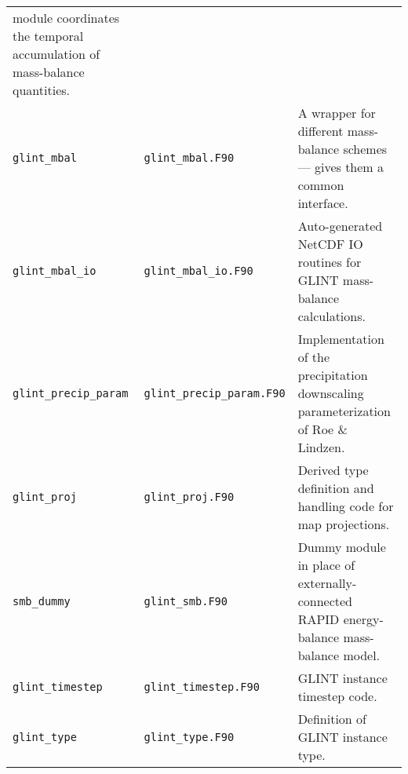 \begin{center}
\begin{supertabular}{|l|l|p{7cm}|}
    module coordinates the temporal accumulation of mass-balance quantities.\\
    \texttt{glint\_mbal} & \texttt{glint\_mbal.F90} & A wrapper for different
    mass-balance schemes --- gives them a common interface. \\
    \texttt{glint\_mbal\_io} & \texttt{glint\_mbal\_io.F90} & Auto-generated
    NetCDF IO routines for GLINT mass-balance calculations. \\
    \texttt{glint\_precip\_param} & \texttt{glint\_precip\_param.F90} & Implementation of the
    precipitation downscaling parameterization of Roe \& Lindzen. \\
    \texttt{glint\_proj} & \texttt{glint\_proj.F90} & Derived type definition
    and handling code for map projections. \\
    \texttt{smb\_dummy} & \texttt{glint\_smb.F90} & Dummy module in place of
    externally-connected RAPID energy-balance mass-balance model. \\
    \texttt{glint\_timestep} & \texttt{glint\_timestep.F90} & GLINT instance
    timestep code. \\
    \texttt{glint\_type} & \texttt{glint\_type.F90} & Definition of GLINT
    instance type. \\
  \end{supertabular}
\end{center}





